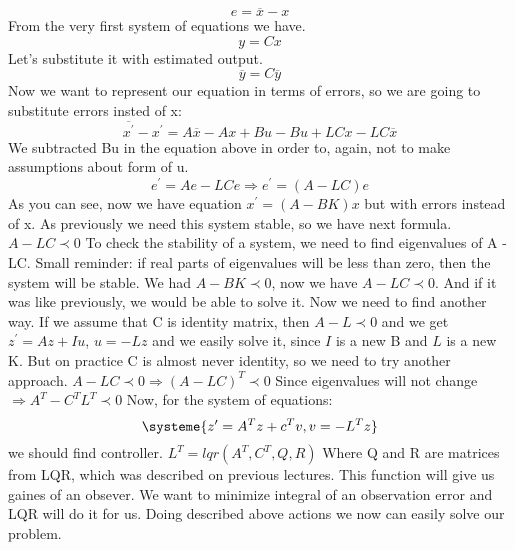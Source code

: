 \documentclass{article}
\begin{document}
\begin{equation}
    e=\overline{x}-x 
\end{equation}
From the very first system of equations we have.
\begin{equation}
    y=Cx
\end{equation}
Let's substitute it with estimated output.
\begin{equation}
    \overline{y}=C\overline{y}
\end{equation}
Now we want to represent our equation in terms of errors, so we are going to substitute errors insted of x:
\begin{equation}
    \overline{x^{\prime}}-x^{\prime}=A\overline{x}-Ax + Bu - Bu + LCx - LC\overline{x}
\end{equation}
We subtracted Bu in the equation above in order to, again, not to make assumptions about form of u.
\begin{equation}
    e^{\prime}=Ae-LCe \Rightarrow e^{\prime}=(A-LC)e
\end{equation}
As you can see, now we have equation $x^\prime = ( A - B K ) x$ but with errors instead of x. As previously we need this system stable, so we have next formula.
\newline
$A-LC \prec 0$
\newline
To check the stability of a system, we need to find eigenvalues of A - LC.
Small reminder: if real parts of eigenvalues will be less than zero, then the system will be stable.
We had $ A - B K \prec 0$, now we have $A-LC \prec 0$. And if it was like previously, we would be able to solve it. Now we need to find another way. 
\newline
If we assume that C is identity matrix, then $A-L \prec 0$ and we get $z^{\prime}=Az+Iu$, $u=-Lz$ and we easily solve it, since $I$ is a new B and $L$ is a new K. But on practice C is almost never identity, so we need to try another approach.
\newline
$A-LC \prec 0 \Rightarrow (A-LC)^{T}\prec 0 $ Since eigenvalues will not change $\Rightarrow A^{T}-C^{T}L^{T}\prec 0$
Now, for the system of equations:
\[
\systeme{z^{\prime}=A^{T}z+c^{T}v,v=-L^{T}z}
\]
we should find controller.
$L^{T}=lqr(A^{T},C^{T},Q,R)$
Where Q and R are matrices from LQR, which was described on previous lectures.
This function will give us gaines of an obsever.
We want to minimize integral of an observation error and LQR will do it for us.
\newline
Doing described above actions we now can easily solve our problem.
\end{document}
